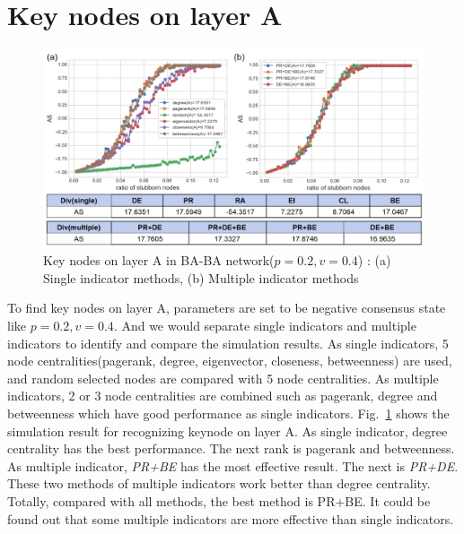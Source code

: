 \section{Key nodes on layer A}
\begin{figure}[!htb]
	\centering
	\includegraphics[width=\hsize]{figure/chap5_keynode_A.png}
	\caption{Key nodes on layer A in BA-BA network($p=0.2, v=0.4$) : (a) Single indicator methods, (b) Multiple indicator methods}
	\label{chap5_keynode_A}
\end{figure}
To find key nodes on layer A, parameters are set to be negative consensus state like $p=0.2, v=0.4$. And we would separate single indicators and multiple indicators to identify and compare the simulation results. As single indicators, 5 node centralities(pagerank, degree, eigenvector, closeness, betweenness) are used, and random selected nodes are compared with 5 node centralities. As multiple indicators, 2 or 3 node centralities are combined such as pagerank, degree and betweenness which have good performance as single indicators.  
Fig.~\ref{chap5_keynode_A} shows the simulation result for recognizing keynode on layer A. As single indicator, degree centrality has the best performance. The next rank is pagerank and betweenness. As multiple indicator, \textit{PR+BE} has the most effective result. The next is \textit{PR+DE}. These two methods of multiple indicators work better than degree centrality. Totally, compared with all methods, the best method is PR+BE. It could be found out that some multiple indicators are more effective than single indicators. 


